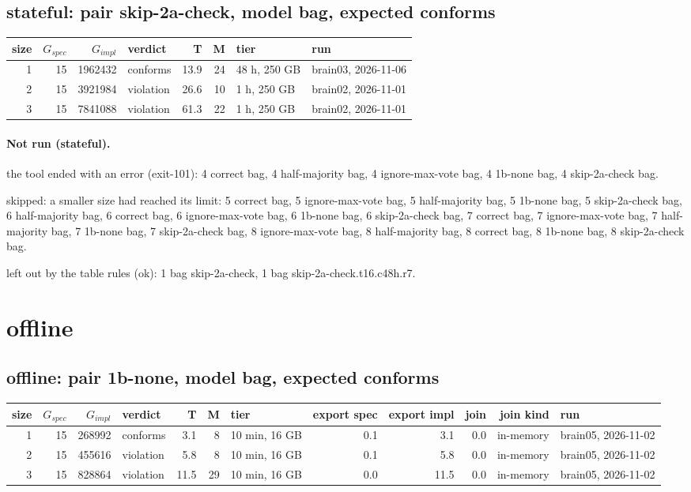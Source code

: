 \documentclass[10pt]{article}
\begin{document}
\subsection*{stateful: pair \textsf{skip-2a-check}, model bag, expected conforms}
\begin{longtable}{@{}rrrlrrll@{}}
\toprule
size & $G_{\mathit{spec}}$ & $G_{\mathit{impl}}$ & verdict & T & M & tier & run \\
\midrule
\endhead
\color{blue} 1 & 15 & 1962432 & conforms & 13.9 & 24 & 48 h, 250 GB & brain03, 2026-11-06 \\
\color{blue} 2 & 15 & 3921984 & violation & 26.6 & 10 & 1 h, 250 GB & brain02, 2026-11-01 \\
\color{blue} 3 & 15 & 7841088 & violation & 61.3 & 22 & 1 h, 250 GB & brain02, 2026-11-01 \\
\bottomrule
\end{longtable}
\paragraph{Not run (stateful).}
the tool ended with an error (exit-101): 4 correct bag, 4 half-majority bag, 4 ignore-max-vote bag, 4 1b-none bag, 4 skip-2a-check bag.\par
skipped: a smaller size had reached its limit: 5 correct bag, 5 ignore-max-vote bag, 5 half-majority bag, 5 1b-none bag, 5 skip-2a-check bag, 6 half-majority bag, 6 correct bag, 6 ignore-max-vote bag, 6 1b-none bag, 6 skip-2a-check bag, 7 correct bag, 7 ignore-max-vote bag, 7 half-majority bag, 7 1b-none bag, 7 skip-2a-check bag, 8 ignore-max-vote bag, 8 half-majority bag, 8 correct bag, 8 1b-none bag, 8 skip-2a-check bag.\par
left out by the table rules (ok): 1 bag skip-2a-check, 1 bag skip-2a-check.t16.c48h.r7.\par
\section*{offline}
\subsection*{offline: pair \textsf{1b-none}, model bag, expected conforms}
\begin{longtable}{@{}rrrlrrlrrrrl@{}}
\toprule
size & $G_{\mathit{spec}}$ & $G_{\mathit{impl}}$ & verdict & T & M & tier & export spec & export impl & join & join kind & run \\
\midrule
\endhead
\color{red} 1 & 15 & 268992 & conforms & 3.1 & 8 & 10 min, 16 GB & 0.1 & 3.1 & 0.0 & in-memory & brain05, 2026-11-02 \\
\color{red} 2 & 15 & 455616 & violation & 5.8 & 8 & 10 min, 16 GB & 0.1 & 5.8 & 0.0 & in-memory & brain05, 2026-11-02 \\
\color{red} 3 & 15 & 828864 & violation & 11.5 & 29 & 10 min, 16 GB & 0.0 & 11.5 & 0.0 & in-memory & brain05, 2026-11-02 \\
\bottomrule
\end{longtable}
\end{document}
